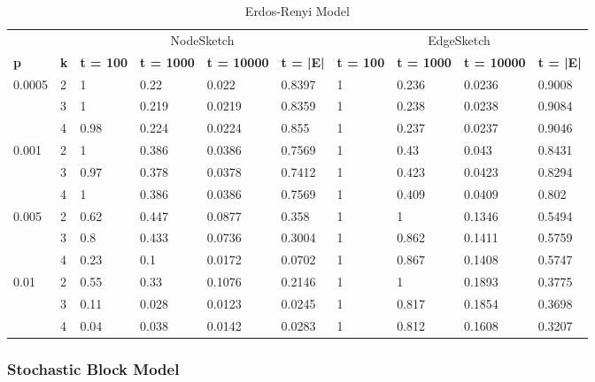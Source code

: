         \begin{table}[!ht]
            \centering
            \begin{tabular}{|l|l|l|l|l|l|l|l|l|l|}
            \hline
                & & \multicolumn{4}{c|}{NodeSketch} & \multicolumn{4}{c|}{EdgeSketch} \\ \cline{1-10}
                \textbf{p} & \textbf{k} & \textbf{t = 100} & \textbf{t = 1000} & \textbf{t = 10000} & \textbf{t = |E|} & \textbf{t = 100} & \textbf{t = 1000} & \textbf{t = 10000} & \textbf{t = |E|} \\ \hline\hline
                \multirow{3}{*}{0.0005} & 2 & 1 & 0.22 & 0.022 & 0.8397 & 1 & 0.236 & 0.0236 & 0.9008 \\ \cline{2-10}
                & 3 & 1 & 0.219 & 0.0219 & 0.8359 & 1 & 0.238 & 0.0238 & 0.9084 \\ \cline{2-10}
                & 4 & 0.98 & 0.224 & 0.0224 & 0.855 & 1 & 0.237 & 0.0237 & 0.9046 \\ \hline\hline
                \multirow{3}{*}{0.001} & 2 & 1 & 0.386 & 0.0386 & 0.7569 & 1 & 0.43 & 0.043 & 0.8431 \\ \cline{2-10}
                & 3 & 0.97 & 0.378 & 0.0378 & 0.7412 & 1 & 0.423 & 0.0423 & 0.8294 \\ \cline{2-10}
                & 4 & 1 & 0.386 & 0.0386 & 0.7569 & 1 & 0.409 & 0.0409 & 0.802 \\ \hline\hline
                \multirow{3}{*}{0.005} & 2 & 0.62 & 0.447 & 0.0877 & 0.358 & 1 & 1 & 0.1346 & 0.5494 \\ \cline{2-10}
                & 3 & 0.8 & 0.433 & 0.0736 & 0.3004 & 1 & 0.862 & 0.1411 & 0.5759 \\ \cline{2-10}
                & 4 & 0.23 & 0.1 & 0.0172 & 0.0702 & 1 & 0.867 & 0.1408 & 0.5747 \\ \hline\hline
                \multirow{3}{*}{0.01} & 2 & 0.55 & 0.33 & 0.1076 & 0.2146 & 1 & 1 & 0.1893 & 0.3775 \\ \cline{2-10}
                & 3 & 0.11 & 0.028 & 0.0123 & 0.0245 & 1 & 0.817 & 0.1854 & 0.3698 \\ \cline{2-10}
                & 4 & 0.04 & 0.038 & 0.0142 & 0.0283 & 1 & 0.812 & 0.1608 & 0.3207 \\ \hline
            \end{tabular}
            \caption{Erdos-Renyi Model}

        \end{table}


    \subsubsection{Stochastic Block Model}
    
